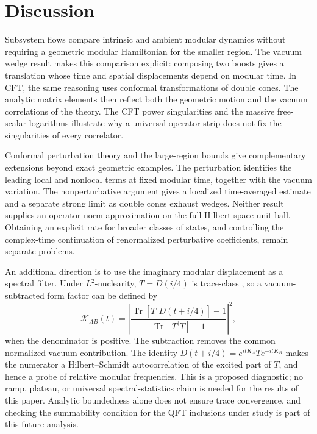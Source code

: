 \documentclass[a4paper,11pt]{article}
\theoremstyle{definition}
\begin{document}
\section{Discussion}\label{sec:discussion}

Subsystem flows compare intrinsic and ambient modular dynamics without requiring
a geometric modular Hamiltonian for the smaller region. The vacuum wedge result
makes this comparison explicit: composing two boosts gives a translation whose
time and spatial displacements depend on modular time. In CFT, the same reasoning
uses conformal transformations of double cones. The analytic matrix elements
then reflect both the geometric motion and the vacuum correlations of the theory.
The CFT power singularities and the massive free-scalar logarithms illustrate
why a universal operator strip does not fix the singularities of every correlator.

Conformal perturbation theory and the large-region bounds give complementary
extensions beyond exact geometric examples. The perturbation identifies the
leading local and nonlocal terms at fixed modular time, together with the vacuum
variation. The nonperturbative argument gives a localized time-averaged estimate
and a separate strong limit as double cones exhaust wedges. Neither result
supplies an operator-norm approximation on the full Hilbert-space unit ball.
Obtaining an explicit rate for broader classes of states, and controlling the
complex-time continuation of renormalized perturbative coefficients, remain
separate problems.

An additional direction is to use the imaginary modular displacement as a spectral
filter. Under $L^2$-nuclearity, $T=D(i/4)$ is trace-class
\cite{buchholz2007nuclearity}, so a vacuum-subtracted form factor can be defined by
\begin{equation}
 \mathcal K_{AB}(t)=\left|
 \frac{\operatorname{Tr}[T^\dagger D(t+i/4)]-1}
 {\operatorname{Tr}[T^\dagger T]-1}
 \right|^2,
 \label{eq:outlook-form-factor}
\end{equation}
when the denominator is positive. The subtraction removes the common normalized
vacuum contribution. The identity
$D(t+i/4)=e^{itK_A}T e^{-itK_B}$ makes the numerator a Hilbert--Schmidt
autocorrelation of the excited part of $T$, and hence a probe of relative modular
frequencies. This is a proposed diagnostic; no ramp, plateau, or universal
spectral-statistics claim is needed for the results of this paper. Analytic
boundedness alone does not ensure trace convergence, and checking the summability
condition for the QFT inclusions under study is part of this future analysis.
\end{document}
